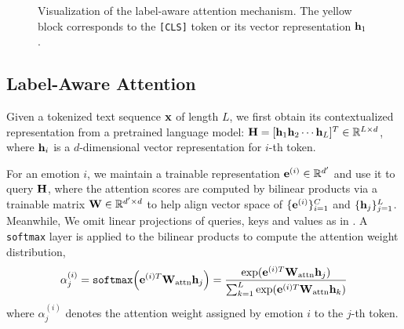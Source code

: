 \begin{figure}
\begin{center}
\end{center}

\caption{Visualization of the label-aware attention mechanism. The yellow block corresponds to the \texttt{[CLS]} token or its vector representation $\mathbf{h}_1$.}
\label{fig:model}
\end{figure}

\subsection{Label-Aware Attention}

Given a tokenized text sequence $\mathbf{x}$ of length $L$, we first obtain its contextualized representation from a pretrained language model: $\mathbf{H} = [\mathbf{h}_1 \mathbf{h}_2 \cdots \mathbf{h}_L]^T \in \mathbb{R}^{L \times d}$, where $\mathbf{h}_i$ is a $d$-dimensional vector representation for $i$-th token. 

For an emotion $i$, we maintain a trainable representation $\mathbf{e}^{(i)} \in \mathbb{R}^{d'}$ and use it to query $\mathbf{H}$, where the attention scores are computed by bilinear products via a trainable matrix $\mathbf{W} \in \mathbb{R}^{d' \times d}$ to help align vector space of $\{\mathbf{e}^{(i)}\}_{i = 1}^C$ and $\{\mathbf{h}_j\}_{j = 1}^L$. Meanwhile, We omit linear projections of queries, keys and values as in \citet{vaswani2017attention}. A \texttt{softmax} layer is applied to the bilinear products to compute the attention weight distribution, 
$$\alpha_j^{(i)} = \texttt{softmax}\Bigl( \mathbf{e}^{(i)T}\mathbf{W}_{\text{attn}}\mathbf{h}_j \Bigr) = \frac{\exp(\mathbf{e}^{(i)T} \mathbf{W}_{\text{attn}}  \mathbf{h}_j)}{\sum_{k = 1}^L \exp(\mathbf{e}^{(i)T} \mathbf{W}_{\text{attn}}  \mathbf{h}_k)}$$
where $\alpha_j^{(i)}$ denotes the attention weight assigned by emotion $i$ to the $j$-th token. 

